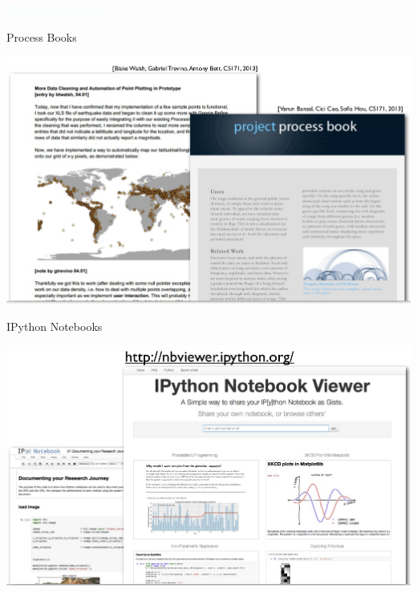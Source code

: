 \documentclass{beamer}
\newcommand{\thblue}[1]{{\Huge {\textcolor{azure}{#1}}}}
\begin{document}
\begin{frame}{}
    \begin{center}
        \thblue{IPython Notebooks}
    \end{center}
\end{frame}
\begin{frame}{Process Books}
    \begin{center}
        \includegraphics[scale=0.3]{processBooks.png}
    \end{center}
\end{frame}
\begin{frame}{IPython Notebooks}
    \begin{center}
        \includegraphics[scale=0.3]{ipythonNotebooks.png}
    \end{center}
\end{frame}
\end{document}
